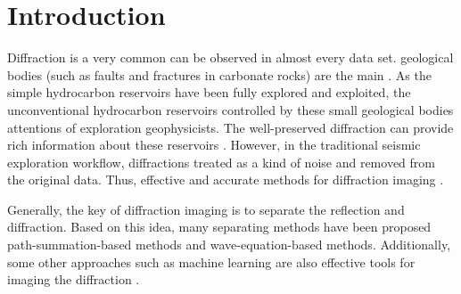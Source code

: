 \maketitle



\section{Introduction}
Diffraction is a very common  can be observed in almost every  data set.  geological bodies (such as  faults and fractures in carbonate rocks) are the main . As the simple hydrocarbon reservoirs have been fully explored and exploited, the unconventional hydrocarbon reservoirs controlled by these small geological bodies  attentions of exploration geophysicists. The well-preserved diffraction can provide rich information about these reservoirs \cite[]{Gelius1995limit,Landa1998moni,decker2017diffraction}. However, in the traditional seismic exploration workflow, diffractions  treated as a kind of noise and removed from the original data.  Thus,  effective and accurate methods for diffraction imaging . 

Generally, the key of diffraction imaging is to  separate the reflection and diffraction. Based on this idea, many separating methods have been proposed  path-summation-based methods and  wave-equation-based methods.  Additionally, some other approaches such as machine learning \cite[]{Tschannen2020dp} are also effective tools for imaging the diffraction \cite[]{Protasov2019spectral}.

